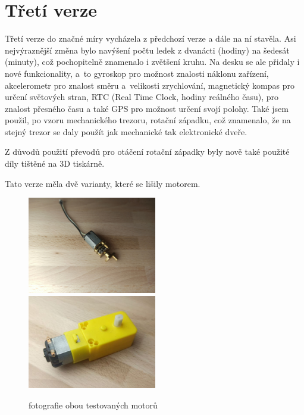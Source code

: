 \section{Třetí verze}


Třetí verze do značné míry vycházela z předchozí verze a dále na ní stavěla. Asi nejvýraznější změna bylo navýšení počtu 
ledek z dvanácti (hodiny) na šedesát (minuty), což pochopitelně znamenalo i zvětšení kruhu. Na desku se ale přidaly i nové funkcionality,
a~to gyroskop pro možnost znalosti náklonu zařízení, akcelerometr pro znalost směru a~velikosti zrychlování, magnetický kompas pro určení světových
stran, RTC (Real Time Clock, hodiny reálného času), pro znalost přesného času a také GPS pro možnost určení svojí polohy.
Také jsem použil, po vzoru mechanického trezoru, rotační západku, což znamenalo, že na stejný trezor se daly použít jak mechanické tak 
elektronické dveře.

Z důvodů použití převodů pro otáčení rotační západky byly nově také použité díly tištěné na 3D tiskárně. 

Tato verze měla dvě varianty, které se lišily motorem.
\begin{figure}[htbp]
    \centering
    \includegraphics[width=160pt]{kapitoly/obrazky/E3/motory/hodinovyStrojek.jpg}
    \includegraphics[width=160pt]{kapitoly/obrazky/E3/motory/zluty_motor.jpg}
    \caption{fotografie obou testovaných motorů} 
    \label{fig:E3-motory}
\end{figure}


